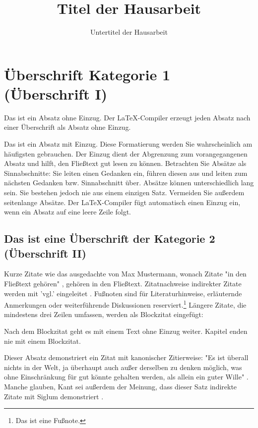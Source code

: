 \documentclass{hausarbeit_philosophie}
\title{Titel der Hausarbeit}
\subtitle{Untertitel der Hausarbeit}
\begin{document}
\maketitle
\tableofcontents
\newpage

\section{Überschrift Kategorie 1 (Überschrift I)}
Das ist ein Absatz ohne Einzug. Der LaTeX-Compiler erzeugt jeden Absatz nach einer Überschrift als Absatz ohne Einzug.

Das ist ein Absatz mit Einzug. Diese Formatierung werden Sie wahrscheinlich am häufigsten gebrauchen. Der Einzug dient der Abgrenzung zum vorangegangenen Absatz und hilft, den Fließtext gut lesen zu können. Betrachten Sie Absätze als Sinnabschnitte: Sie leiten einen Gedanken ein, führen diesen aus und leiten zum nächsten Gedanken bzw. Sinnabschnitt über. Absätze können unterschiedlich lang sein. Sie bestehen jedoch nie aus einem einzigen Satz. Vermeiden Sie außerdem seitenlange Absätze. Der LaTeX-Compiler fügt automatisch einen Einzug ein, wenn ein Absatz auf eine leere Zeile folgt.

\subsection{Das ist eine Überschrift der Kategorie 2 (Überschrift II)}
Kurze Zitate wie das ausgedachte von Max Mustermann, wonach Zitate "in den Fließtext gehören" \cite[14]{MusZit}, gehören in den Fließtext. Zitatnachweise indirekter Zitate werden mit 'vgl.' eingeleitet . Fußnoten sind für Literaturhinweise, erläuternde Anmerkungen oder weiterführende Diskussionen reserviert.\footnote{Das ist eine Fußnote.} Längere Zitate, die mindestens drei Zeilen umfassen, werden als Blockzitat eingefügt:


Nach dem Blockzitat geht es mit einem Text ohne Einzug weiter. Kapitel enden nie mit einem Blockzitat.

Dieser Absatz demonstriert ein Zitat mit kanonischer Zitierweise: "Es ist überall nichts in der Welt, ja überhaupt auch außer derselben zu denken möglich, was ohne Einschränkung für gut könnte gehalten werden, als allein ein guter Wille" \cite[393]{GMS}. Manche glauben, Kant sei außerdem der Meinung, dass dieser Satz indirekte Zitate mit Siglum demonstriert .

\printbibliography
\end{document}
